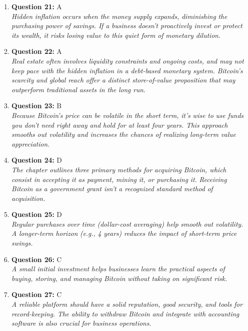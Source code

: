 \documentclass[12pt,a4paper]{article}
\begin{document}
\begin{enumerate}
\item \textbf{Question 21:} A
\\ \textit{Hidden inflation occurs when the money supply expands, diminishing the purchasing power of savings. If a business doesn't proactively invest or protect its wealth, it risks losing value to this quiet form of monetary dilution.}

\item \textbf{Question 22:} A
\\ \textit{Real estate often involves liquidity constraints and ongoing costs, and may not keep pace with the hidden inflation in a debt-based monetary system. Bitcoin’s scarcity and global reach offer a distinct store-of-value proposition that may outperform traditional assets in the long run.}

\item \textbf{Question 23:} B
\\ \textit{Because Bitcoin’s price can be volatile in the short term, it’s wise to use funds you don’t need right away and hold for at least four years. This approach smooths out volatility and increases the chances of realizing long-term value appreciation.}

\item \textbf{Question 24:} D
\\ \textit{The chapter outlines three primary methods for acquiring Bitcoin, which consist in accepting it as payment, mining it, or purchasing it. Receiving Bitcoin as a government grant isn’t a recognized standard method of acquisition.}

\item \textbf{Question 25:} D
\\ \textit{Regular purchases over time (dollar-cost averaging) help smooth out volatility. A longer-term horizon (e.g., 4 years) reduces the impact of short-term price swings.}

\item \textbf{Question 26:} C
\\ \textit{A small initial investment helps businesses learn the practical aspects of buying, storing, and managing Bitcoin without taking on significant risk.}

\item \textbf{Question 27:} C
\\ \textit{A reliable platform should have a solid reputation, good security, and tools for record-keeping. The ability to withdraw Bitcoin and integrate with accounting software is also crucial for business operations.}


\end{enumerate}
\end{document}

